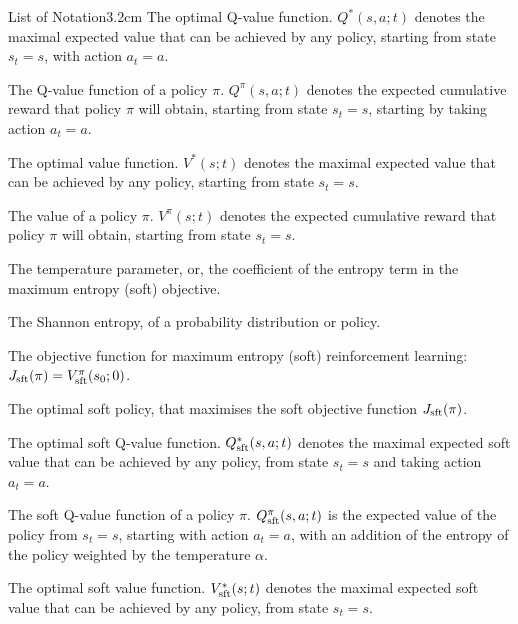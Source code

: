 \begin{mclistof}{List of Notation}{3.2cm}
        The optimal Q-value function. $Q^*(s,a;t)$ denotes the maximal expected value that can be achieved by any policy, starting from state $s_t=s$, with action $a_t=a$.
    \item[$Q^{\pi}$]
        The Q-value function of a policy $\pi$. $Q^{\pi}(s,a;t)$ denotes the expected cumulative reward that policy $\pi$ will obtain, starting from state $s_t=s$, starting by taking action $a_t=a$.
    \item[$V^*$]
        The optimal value function. $V^*(s;t)$ denotes the maximal expected value that can be achieved by any policy, starting from state $s_t=s$.
    \item[$V^{\pi}$]
        The value of a policy $\pi$. $V^{\pi}(s;t)$ denotes the expected cumulative reward that policy $\pi$ will obtain, starting from state $s_t=s$. %
    \\
    \item[$\alpha$] 
        The temperature parameter, or, the coefficient of the entropy term in the maximum entropy (soft) objective.
    \item[$\cl{H}$]
        The Shannon entropy, of a probability distribution or policy.
    \item[$J_{\sft}(\pi)$] 
        The objective function for maximum entropy (soft) reinforcement learning: $J_{{\textnormal{sft}}}(\pi) = V_{{\textnormal{sft}}}^{\pi}(s_0;0)$.
    \item[$\pi_{\sft}^*$]
        The optimal soft policy, that maximises the soft objective function $J_{\sft}(\pi)$.
    \item[$Q_{\sft}^*$]
        The optimal soft Q-value function. $Q_{{\textnormal{sft}}}^*(s,a;t)$ denotes the maximal expected soft value that can be achieved by any policy, from state $s_t=s$ and taking action $a_t=a$. 
    \item[$Q_{\sft}^{\pi}$]
        The soft Q-value function of a policy $\pi$. $Q_{{\textnormal{sft}}}^{\pi}(s,a;t)$ is the expected value of the policy from $s_t=s$, starting with action $a_t=a$, with an addition of the entropy of the policy weighted by the temperature $\alpha$.
    \item[$V_{\sft}^*$]
        The optimal soft value function. $V_{{\textnormal{sft}}}^*(s;t)$ denotes the maximal expected soft value that can be achieved by any policy, from state $s_t=s$. 
    \item[$V_{\sft}^{\pi}$]

\end{mclistof}

